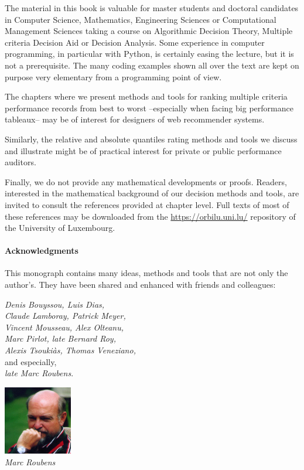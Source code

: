 The material in this book is valuable for master students and doctoral candidates in Computer Science, Mathematics, Engineering Sciences or Computational Management Sciences taking a course on Algorithmic Decision Theory, Multiple criteria Decision Aid or Decision Analysis. Some experience in computer programming, in particular with Python, is certainly easing the lecture, but it is not a prerequisite. The many coding examples shown all over the text are kept on purpose very elementary from a programming point of view. 

The chapters where we present methods and tools for ranking multiple criteria performance records from best to worst --especially when facing big performance tableaux-- may be of interest for designers of web recommender systems. 

Similarly, the relative and absolute quantiles rating methods and tools we discuss and illustrate might be of practical interest for private or public performance auditors.

Finally, we do not provide any mathematical developments or proofs. Readers, interested in the mathematical background of our decision methods and tools, are invited to consult the references provided at chapter level. Full texts of most of these references may be downloaded from the \href{https://orbilu.uni.lu/}{https://orbilu.uni.lu/} repository of the University of Luxembourg. 

\paragraph{Acknowledgments}

This monograph contains many ideas, methods and tools that are not only the author’s. They have been shared and enhanced with friends and colleagues: 

\vspace{0.5cm}
\begin{minipage}{7cm}
\emph{Denis Bouyssou, Luis Dias,}\\ 
\emph{Claude Lamboray, Patrick Meyer,}\\
\emph{Vincent Mousseau, Alex Olteanu,}\\
\emph{Marc Pirlot, late Bernard Roy,}\\
\emph{Alexis Tsouki\`as, Thomas Veneziano,}\\
and especially,\\
\emph{late Marc Roubens}.
\end{minipage}\quad
\begin{minipage}{3cm}
\includegraphics[width=3cm]{Figures/Marc-Roubens.jpg} \\
{\tiny \emph{Marc Roubens}}
\end{minipage}

